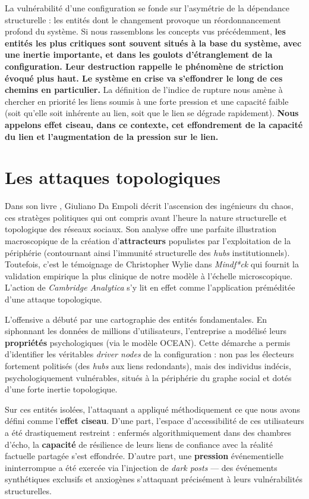 \documentclass{report}
\begin{document}
	La vulnérabilité d'une configuration se fonde sur l'asymétrie de la dépendance structurelle : les entités dont le changement provoque un réordonnancement profond du système. Si nous rassemblons les concepts vus précédemment, \textbf{les entités les plus critiques sont souvent situés à la base du système, avec une inertie importante, et dans les goulots d'étranglement de la configuration. Leur destruction rappelle le phénomène de striction évoqué plus haut. Le système en crise va s'effondrer le long de ces chemins en particulier.} La définition de l'indice de rupture nous amène à chercher en priorité les liens soumis à une forte pression et une capacité faible (soit qu'elle soit inhérente au lien, soit que le lien se dégrade rapidement). \textbf{Nous appelons effet ciseau, dans ce contexte, cet effondrement de la capacité du lien et l'augmentation de la pression sur le lien.}
	
	
	\section{Les attaques topologiques}
	
	Dans son livre \cite{DaEmpoli2019}, Giuliano Da Empoli décrit l'ascension des \og{}ingénieurs du chaos\fg{}, ces stratèges politiques qui ont compris avant l'heure la nature structurelle et topologique des réseaux sociaux. Son analyse offre une parfaite illustration macroscopique de la création d'\textbf{attracteurs} populistes par l'exploitation de la périphérie (contournant ainsi l'immunité structurelle des \textit{hubs} institutionnels). Toutefois, c'est le témoignage de Christopher Wylie dans \textit{Mindf*ck} \cite{Wylie2020} qui fournit la validation empirique la plus clinique de notre modèle à l'échelle microscopique. L'action de \textit{Cambridge Analytica} s'y lit en effet comme l'application préméditée d'une attaque topologique.
	
	L'offensive a débuté par une cartographie des entités fondamentales. En siphonnant les données de millions d'utilisateurs, l'entreprise a modélisé leurs \textbf{propriétés} psychologiques (via le modèle OCEAN). Cette démarche a permis d'identifier les véritables \textit{driver nodes} de la configuration : non pas les électeurs fortement politisés (des \textit{hubs} aux liens redondants), mais des individus indécis, psychologiquement vulnérables, situés à la périphérie du graphe social et dotés d'une forte inertie topologique.
	
	Sur ces entités isolées, l'attaquant a appliqué méthodiquement ce que nous avons défini comme l'\textbf{effet ciseau}. D'une part, l'espace d'accessibilité de ces utilisateurs a été drastiquement restreint : enfermés algorithmiquement dans des chambres d'écho, la \textbf{capacité} de résilience de leurs liens de confiance avec la réalité factuelle partagée s'est effondrée. D'autre part, une \textbf{pression} événementielle ininterrompue a été exercée via l'injection de \textit{dark posts} — des événements synthétiques exclusifs et anxiogènes s'attaquant précisément à leurs vulnérabilités structurelles.
	
\end{document}
